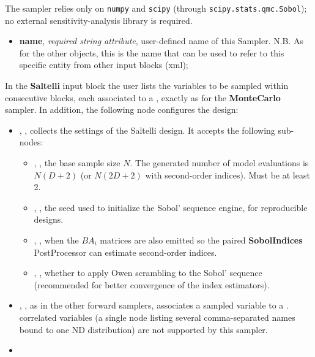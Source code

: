 The sampler relies only on \texttt{numpy} and \texttt{scipy} (through
\texttt{scipy.stats.qmc.Sobol}); no external sensitivity-analysis library is
required.
%
\attrsIntro
\vspace{-5mm}
\begin{itemize}
\itemsep0em
\item \textbf{name}, \textit{required string attribute}, user-defined name of this Sampler. N.B. As for the other objects, this is the name that can be used to refer to this specific entity from other input blocks (xml);
\end{itemize}
\vspace{-5mm}

In the \textbf{Saltelli} input block the user lists the variables to be sampled
within consecutive  blocks, each associated to a
, exactly as for the \textbf{MonteCarlo} sampler. In
addition, the following node configures the design:
\begin{itemize}
  \item {}, , collects
    the settings of the Saltelli design. It accepts the following sub-nodes:
    \begin{itemize}
      \item {}, , the base sample size
        $N$. The generated number of model evaluations is $N(D+2)$ (or
        $N(2D+2)$ with second-order indices). Must be at least 2.
      \item {}, , the seed
        used to initialize the Sobol' sequence engine, for reproducible designs.
      \item {}, , when
         the $BA_i$ matrices are also emitted so the paired
        \textbf{SobolIndices} PostProcessor can estimate second-order indices.
      \item {}, , whether to apply
        Owen scrambling to the Sobol' sequence (recommended for better
        convergence of the index estimators). 
    \end{itemize}
  \item {}, , as in the
    other forward samplers, associates a sampled variable to a
    . \nb correlated variables (a single 
    node listing several comma-separated names bound to one ND distribution) are
    not supported by this sampler.
  \item \constantVariablesDescription
\end{itemize}

